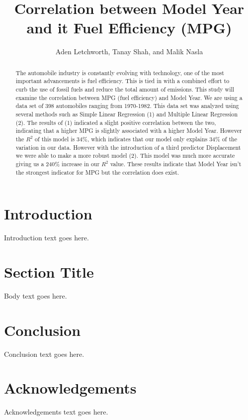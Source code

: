 \documentclass[journal]{IEEEtran}
\title{Correlation between Model Year and it Fuel Efficiency
(MPG)}
\author{Aden Letchworth, Tanay Shah, and Malik Nasla}
\begin{document}
\maketitle

\begin{abstract}
The automobile industry is constantly evolving with technology, 
one of the most important advancements is fuel efficiency. 
This is tied in with a combined effort to curb the use of fossil fuels and reduce the total amount of emissions. 
This study will examine the correlation between MPG (fuel efficiency) and Model Year. 
We are using a data set of 398 automobiles ranging from 1970-1982. 
This data set was analyzed using several methods such as Simple Linear Regression (1) and Multiple Linear Regression (2). 
The results of (1) indicated a slight positive correlation between the two, indicating that a higher MPG is slightly associated with a higher Model Year. 
However the $R^{2}$ of this model is 34\%, which indicates that our model only explains 34\% of the variation in our data. 
However with the introduction of a third predictor Displacement we were able to make a more robust model (2). 
This model was much more accurate giving us a 240\% increase in our $R^{2}$ value. 
These results indicate that Model Year isn't the strongest indicator for MPG but the correlation does exist. 
\end{abstract}

\section{Introduction}
Introduction text goes here.

\section{Section Title}
Body text goes here.

\section{Conclusion}
Conclusion text goes here.

\section*{Acknowledgements}
Acknowledgements text goes here.




\end{document}
